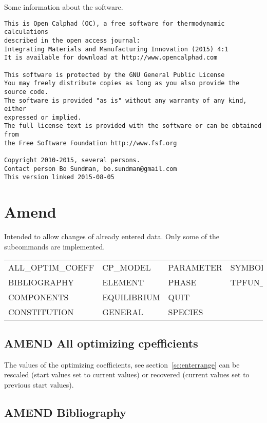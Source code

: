 \documentclass[12pt]{article}
\begin{document}
Some information about the software.

\begin{verbatim}
This is Open Calphad (OC), a free software for thermodynamic calculations
described in the open access journal:
Integrating Materials and Manufacturing Innovation (2015) 4:1
It is available for download at http://www.opencalphad.com

This software is protected by the GNU General Public License
You may freely distribute copies as long as you also provide the source code.
The software is provided "as is" without any warranty of any kind, either
expressed or implied.
The full license text is provided with the software or can be obtained from
the Free Software Foundation http://www.fsf.org

Copyright 2010-2015, several persons.
Contact person Bo Sundman, bo.sundman@gmail.com
This version linked 2015-08-05
\end{verbatim}

\section{Amend}

Intended to allow changes of already entered data. Only some
of the subcommands are implemented.

\begin{tabular}{llll}
 ALL\_OPTIM\_COEFF & CP\_MODEL     &    PARAMETER  &      SYMBOL \\
 BIBLIOGRAPHY     & ELEMENT       &   PHASE       &     TPFUN\_SYMBOL\\
 COMPONENTS       & EQUILIBRIUM   &   QUIT     \\
 CONSTITUTION     & GENERAL       &   SPECIES \\
\end{tabular}

\subsection{AMEND All optimizing cpefficients}

The values of the optimizing coefficients, see
section~\ref{sc:enterrange} can be rescaled (start values set to
current values) or recovered (current values set to previous start
values).

\subsection{AMEND Bibliography}
\end{document}
